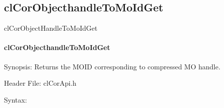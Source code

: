 \begin{flushleft}
\subsection{clCorObjecthandleToMoIdGet}clCorObjectHandleToMoIdGet 
\hypertarget{pagecor110}{}\paragraph{cl\-Cor\-Object\-handle\-To\-MoId\-Get}\label{pagecor110}
\begin{Desc}
\item[Synopsis:]Returns the MOID corresponding to compressed MO handle.\end{Desc}
\begin{Desc}
\item[Header File:]clCorApi.h\end{Desc}
\begin{Desc}
\item[Syntax:]


\end{Desc}
\end{flushleft}
